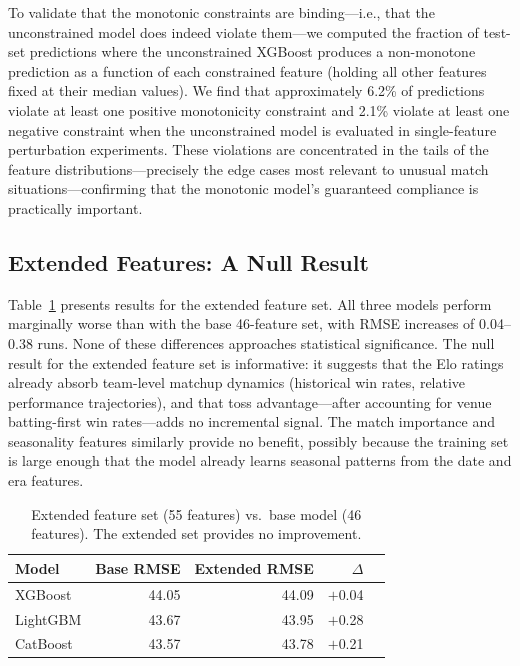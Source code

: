 \documentclass[10pt,a4paper,twocolumn]{article}
\begin{document}
To validate that the monotonic constraints are binding---i.e., that the unconstrained model does indeed violate them---we computed the fraction of test-set predictions where the unconstrained XGBoost produces a non-monotone prediction as a function of each constrained feature (holding all other features fixed at their median values). We find that approximately 6.2\% of predictions violate at least one positive monotonicity constraint and 2.1\% violate at least one negative constraint when the unconstrained model is evaluated in single-feature perturbation experiments. These violations are concentrated in the tails of the feature distributions---precisely the edge cases most relevant to unusual match situations---confirming that the monotonic model's guaranteed compliance is practically important.

\subsection{Extended Features: A Null Result}
\label{sec:v3}

Table~\ref{tab:v3} presents results for the extended feature set. All three models perform marginally worse than with the base 46-feature set, with RMSE increases of 0.04--0.38 runs. None of these differences approaches statistical significance. The null result for the extended feature set is informative: it suggests that the Elo ratings already absorb team-level matchup dynamics (historical win rates, relative performance trajectories), and that toss advantage---after accounting for venue batting-first win rates---adds no incremental signal. The match importance and seasonality features similarly provide no benefit, possibly because the training set is large enough that the model already learns seasonal patterns from the date and era features.

\begin{table}[H]
\centering
\caption{Extended feature set (55 features) vs.\ base model (46 features). The extended set provides no improvement.}
\label{tab:v3}
\small
\begin{tabular}{@{}lrrrr@{}}
\toprule
\textbf{Model} & \textbf{Base RMSE} & \textbf{Extended RMSE} & \textbf{$\Delta$} \\
\midrule
XGBoost   & 44.05 & 44.09 & $+$0.04 \\
LightGBM  & 43.67 & 43.95 & $+$0.28 \\
CatBoost  & 43.57 & 43.78 & $+$0.21 \\
\bottomrule
\end{tabular}
\end{table}
\end{document}

